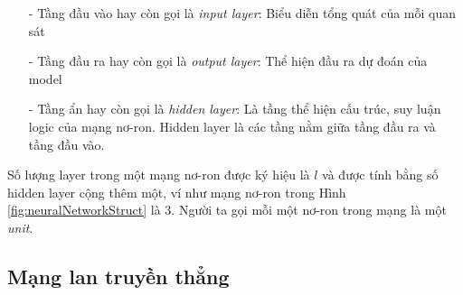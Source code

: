 \begin{itemize}
\setlength{\itemindent}{5mm}
	\item[-] Tầng đầu vào hay còn gọi là \textit{input layer}: Biểu diễn tổng quát của mỗi quan sát
	\item[-] Tầng đầu ra hay còn gọi là \textit{output layer}: Thể hiện đầu ra dự đoán của model
	\item[-] Tầng ẩn hay còn gọi là \textit{hidden layer}: Là tầng thể hiện cấu trúc, suy luận logic của mạng nơ-ron. Hidden layer là các tầng nằm giữa tầng đầu ra và tầng đầu vào.\end{itemize}\par
Số lượng layer trong một mạng nơ-ron được ký hiệu là $l$ và được tính bằng số hidden layer cộng thêm một, ví như mạng nơ-ron trong Hình \ref{fig:neuralNetworkStruct} là 3. Người ta gọi mỗi một nơ-ron trong mạng là một \textit{unit}.
%
\subsection{Mạng lan truyền thẳng}
